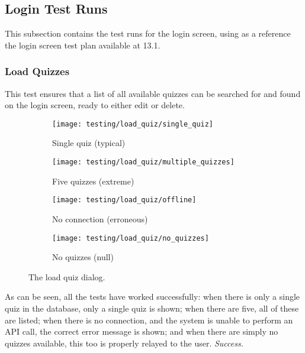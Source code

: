 \subsection{Login Test Runs}
This subsection contains the test runs for the login screen, using as a reference the login screen test plan available at 13.1.

\subsubsection{Load Quizzes}
This test ensures that a list of all available quizzes can be searched for and found on the login screen, ready to either edit or delete.

\begin{figure}[!htbp]
\centering
\begin{subfigure}{0.5\textwidth}
  \centering
  \texttt{[image: testing/load\_quiz/single\_quiz]}
  \caption{Single quiz (typical)}
  \label{fig:sub1}
\end{subfigure}%
\begin{subfigure}{0.5\textwidth}
  \centering
  \texttt{[image: testing/load\_quiz/multiple\_quizzes]}
  \caption{Five quizzes (extreme)}
  \label{fig:sub2}
\end{subfigure}
\begin{subfigure}{0.5\textwidth}
  \centering
  \texttt{[image: testing/load\_quiz/offline]}
  \caption{No connection (erroneous)}
  \label{fig:sub2}
\end{subfigure}
\begin{subfigure}{0.5\textwidth}
  \centering
  \texttt{[image: testing/load\_quiz/no\_quizzes]}
  \caption{No quizzes (null)}
  \label{fig:sub2}
\end{subfigure}
\caption{The load quiz dialog.}
\label{fig:test}
\end{figure}
As can be seen, all the tests have worked successfully: when there is only a single quiz in the database, only a single quiz is shown; when there are five, all of these are listed; when there is no connection, and the system is unable to perform an API call, the correct error message is shown; and when there are simply no quizzes available, this too is properly relayed to the user. \textit{Success.}
